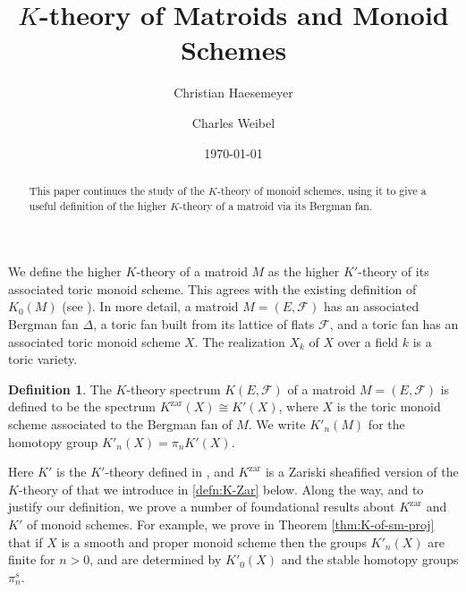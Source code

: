 \documentclass[12pt]{amsart}
\def\cF{\mathcal F}
\def\Kzar{K^{\mathrm{zar}}}
\numberwithin{equation}{section}
\theoremstyle{plain}
\theoremstyle{definition}
\newtheorem{defn}[equation]{Definition}
\theoremstyle{remark}
\begin{document}
\title{$K$-theory of Matroids and Monoid Schemes}
\date{\today}
\author{Christian Haesemeyer}
\address{School of Mathematics and Statistics, University of Melbourne,
VIC 3010, Australia}


\author{Charles Weibel}
\address{Math.\ Dept., Rutgers University, New Brunswick, NJ 08901, USA}
\begin{abstract}
This paper continues the study of the $K$-theory of monoid schemes,
using it to give 
a useful definition of the higher $K$-theory of a matroid
via its Bergman fan.
\end{abstract}
\maketitle

We define the higher $K$-theory of a matroid $M$
as the higher $K'$-theory of its associated toric monoid scheme.
This agrees with the existing definition of $K_0(M)$
(see \cite{LLPP}).
In more detail,
a matroid $M=(E,\cF)$ has an associated Bergman fan $\Delta$,
a toric fan built from its lattice of flats $\cF$, and a toric fan
has an associated toric monoid scheme $X$. The realization
$X_k$ of $X$ over a field $k$ is a toric variety.

\begin{defn}\label{def:K-of-matroid}
The $K$-theory spectrum $K(E,\cF)$ of a matroid $M=(E,\cF)$ is defined
to be the spectrum $\Kzar(X) \cong K'(X)$, where $X$ is
the toric monoid scheme associated to the Bergman fan of $M$.
We write $K'_n(M)$ for the homotopy group
$K'_n(X) = \pi_nK'(X)$. 
\end{defn}


Here $K'$ is the $K'$-theory defined in \cite{HW}, and $\Kzar$ is a
Zariski sheafified version of the $K$-theory of \cite{ELY} that we
introduce in \ref{defn:K-Zar} below.
Along the way, and to justify our definition, we prove a
number of foundational results about $\Kzar$ and $K'$ of monoid
schemes. For example, we prove in Theorem \ref{thm:K-of-sm-proj}
that if $X$ is a smooth and proper monoid scheme then
the groups $K'_n(X)$ are finite for $n>0$, and are determined by
$K'_0(X)$ and the stable homotopy groups $\pi_n^s$.

\medskip
\end{document}
